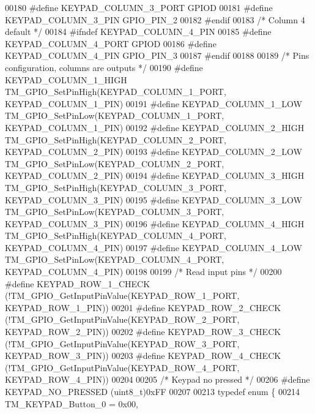 \begin{DoxyCode}
00180 \textcolor{preprocessor}{#define KEYPAD\_COLUMN\_3\_PORT        GPIOD}
00181 \textcolor{preprocessor}{#define KEYPAD\_COLUMN\_3\_PIN         GPIO\_PIN\_2}
00182 \textcolor{preprocessor}{#endif}
00183 \textcolor{comment}{/* Column 4 default */}
00184 \textcolor{preprocessor}{#ifndef KEYPAD\_COLUMN\_4\_PIN}
00185 \textcolor{preprocessor}{#define KEYPAD\_COLUMN\_4\_PORT        GPIOD}
00186 \textcolor{preprocessor}{#define KEYPAD\_COLUMN\_4\_PIN         GPIO\_PIN\_3}
00187 \textcolor{preprocessor}{#endif}
00188 
00189 \textcolor{comment}{/* Pins configuration, columns are outputs */}
00190 \textcolor{preprocessor}{#define KEYPAD\_COLUMN\_1\_HIGH        TM\_GPIO\_SetPinHigh(KEYPAD\_COLUMN\_1\_PORT, KEYPAD\_COLUMN\_1\_PIN)}
00191 \textcolor{preprocessor}{#define KEYPAD\_COLUMN\_1\_LOW         TM\_GPIO\_SetPinLow(KEYPAD\_COLUMN\_1\_PORT, KEYPAD\_COLUMN\_1\_PIN)}
00192 \textcolor{preprocessor}{#define KEYPAD\_COLUMN\_2\_HIGH        TM\_GPIO\_SetPinHigh(KEYPAD\_COLUMN\_2\_PORT, KEYPAD\_COLUMN\_2\_PIN)}
00193 \textcolor{preprocessor}{#define KEYPAD\_COLUMN\_2\_LOW         TM\_GPIO\_SetPinLow(KEYPAD\_COLUMN\_2\_PORT, KEYPAD\_COLUMN\_2\_PIN)}
00194 \textcolor{preprocessor}{#define KEYPAD\_COLUMN\_3\_HIGH        TM\_GPIO\_SetPinHigh(KEYPAD\_COLUMN\_3\_PORT, KEYPAD\_COLUMN\_3\_PIN)}
00195 \textcolor{preprocessor}{#define KEYPAD\_COLUMN\_3\_LOW         TM\_GPIO\_SetPinLow(KEYPAD\_COLUMN\_3\_PORT, KEYPAD\_COLUMN\_3\_PIN)}
00196 \textcolor{preprocessor}{#define KEYPAD\_COLUMN\_4\_HIGH        TM\_GPIO\_SetPinHigh(KEYPAD\_COLUMN\_4\_PORT, KEYPAD\_COLUMN\_4\_PIN)}
00197 \textcolor{preprocessor}{#define KEYPAD\_COLUMN\_4\_LOW         TM\_GPIO\_SetPinLow(KEYPAD\_COLUMN\_4\_PORT, KEYPAD\_COLUMN\_4\_PIN)}
00198 
00199 \textcolor{comment}{/* Read input pins */}
00200 \textcolor{preprocessor}{#define KEYPAD\_ROW\_1\_CHECK          (!TM\_GPIO\_GetInputPinValue(KEYPAD\_ROW\_1\_PORT, KEYPAD\_ROW\_1\_PIN))}
00201 \textcolor{preprocessor}{#define KEYPAD\_ROW\_2\_CHECK          (!TM\_GPIO\_GetInputPinValue(KEYPAD\_ROW\_2\_PORT, KEYPAD\_ROW\_2\_PIN))}
00202 \textcolor{preprocessor}{#define KEYPAD\_ROW\_3\_CHECK          (!TM\_GPIO\_GetInputPinValue(KEYPAD\_ROW\_3\_PORT, KEYPAD\_ROW\_3\_PIN))}
00203 \textcolor{preprocessor}{#define KEYPAD\_ROW\_4\_CHECK          (!TM\_GPIO\_GetInputPinValue(KEYPAD\_ROW\_4\_PORT, KEYPAD\_ROW\_4\_PIN))}
00204 
00205 \textcolor{comment}{/* Keypad no pressed */}
00206 \textcolor{preprocessor}{#define KEYPAD\_NO\_PRESSED           (uint8\_t)0xFF}
00207 
00213 \textcolor{keyword}{typedef} \textcolor{keyword}{enum} \{
00214     TM\_KEYPAD\_Button\_0 = 0x00,

\end{DoxyCode}
